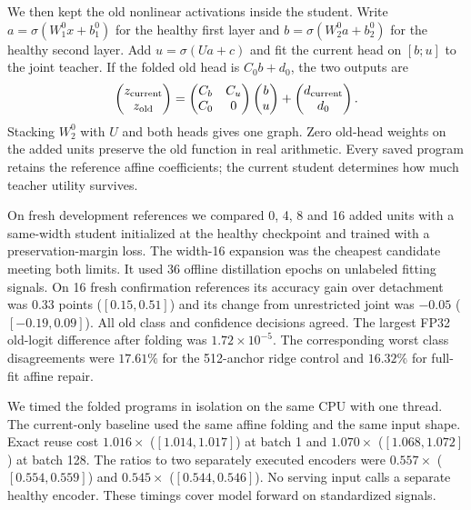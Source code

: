 We then kept the old nonlinear activations inside the student. Write
$a=\sigma(W_1^0x+b_1^0)$ for the healthy first layer and
$b=\sigma(W_2^0a+b_2^0)$ for the healthy second layer. Add
$u=\sigma(Ua+c)$ and fit the current head on $[b;u]$ to the joint
teacher. If the folded old head is $C_0b+d_0$, the two outputs are
\begin{equation}
\begin{pmatrix}z_{\rm current}\\ z_{\rm old}\end{pmatrix}
=
\begin{pmatrix}C_b&C_u\\ C_0&0\end{pmatrix}
\begin{pmatrix}b\\u\end{pmatrix}
+
\begin{pmatrix}d_{\rm current}\\d_0\end{pmatrix}.
\end{equation}
Stacking $W_2^0$ with $U$ and both heads gives one graph. Zero old-head
weights on the added units preserve the old function in real arithmetic.
Every saved program retains the reference affine coefficients; the current
student determines how much teacher utility survives.

On fresh development references we compared 0, 4, 8 and 16 added
units with a same-width student initialized at the healthy checkpoint
and trained with a preservation-margin loss. The width-16 expansion
was the cheapest candidate meeting both limits. It used 36 offline
distillation epochs on unlabeled fitting signals. On 16 fresh
confirmation references its accuracy gain over detachment was $0.33$
points ($[0.15,0.51]$) and its change from unrestricted joint was
$-0.05$ ($[-0.19,0.09]$). All old class and confidence decisions agreed.
The largest FP32 old-logit difference after folding was
$1.72\times10^{-5}$. The corresponding worst class disagreements were
$17.61\%$ for the 512-anchor ridge control and $16.32\%$ for full-fit
affine repair.

We timed the folded programs in isolation on the same CPU with one
thread. The current-only baseline used the same affine folding and
the same input shape. Exact reuse cost $1.016\times$ ($[1.014,1.017]$)
at batch 1 and $1.070\times$ ($[1.068,1.072]$) at batch 128. The ratios
to two separately executed encoders were $0.557\times$ ($[0.554,0.559]$)
and $0.545\times$ ($[0.544,0.546]$). No serving input calls a separate
healthy encoder. These timings cover model forward on standardized
signals.

